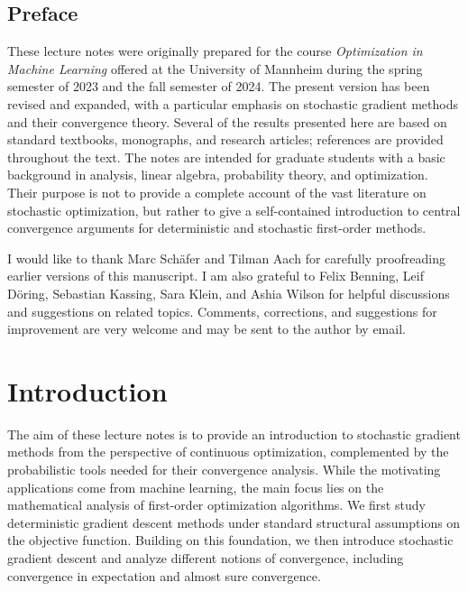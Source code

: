 \documentclass[12pt,openany]{book}
\theoremstyle{definition}
\theoremstyle{definition}
\begin{document}
\section*{Preface}
These lecture notes were originally prepared for the course \textit{Optimization in Machine Learning} offered at the University of Mannheim during the spring semester of 2023 and the fall semester of 2024. The present version has been revised and expanded, with a particular emphasis on stochastic gradient methods and their convergence theory. Several of the results presented here are based on standard textbooks, monographs, and research articles; references are provided throughout the text. The notes are intended for graduate students with a basic background in analysis, linear algebra, probability theory, and optimization. Their purpose is not to provide a complete account of the
vast literature on stochastic optimization, but rather to give a self-contained introduction to central convergence arguments for deterministic and stochastic first-order methods.

I would like to thank Marc Schäfer and Tilman Aach for carefully proofreading earlier versions of this manuscript. I am also grateful to Felix Benning, Leif Döring, Sebastian Kassing, Sara Klein, and Ashia Wilson for helpful discussions and suggestions on related topics. Comments, corrections, and suggestions for improvement are very welcome and may be sent to the author by email. \medskip 

\newpage

\tableofcontents

\newpage
\chapter{Introduction}\label{ch:Intro}
The aim of these lecture notes is to provide an introduction to stochastic gradient methods from
the perspective of continuous optimization, complemented by the probabilistic tools needed for
their convergence analysis. While the motivating applications come from machine learning, the
main focus lies on the mathematical analysis of first-order optimization algorithms. We first study
deterministic gradient descent methods under standard structural assumptions on the objective
function. Building on this foundation, we then introduce stochastic gradient descent and analyze
different notions of convergence, including convergence in expectation and almost sure convergence.\medskip
\end{document}
